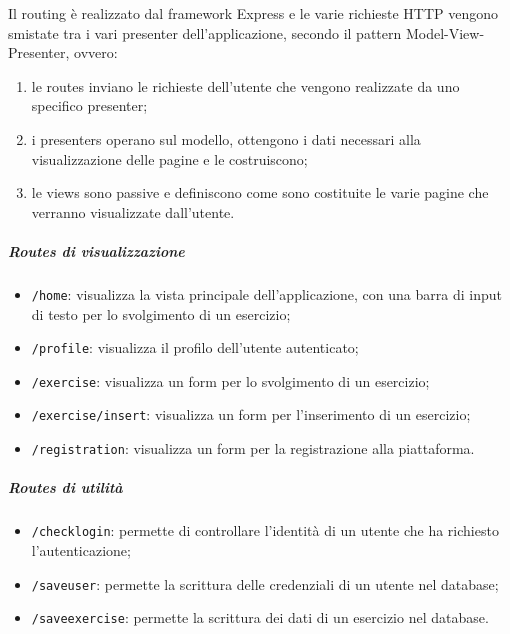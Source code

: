 \noindent Il routing è realizzato dal framework Express e le varie richieste HTTP vengono smistate tra i vari presenter dell'applicazione, secondo il pattern Model-View-Presenter, ovvero:
\begin{enumerate}
	\item le routes inviano le richieste dell'utente che vengono realizzate da uno specifico presenter;
	\item i presenters operano sul modello, ottengono i dati necessari alla visualizzazione delle pagine e le costruiscono;
	\item le views sono passive e definiscono come sono costituite le varie pagine che verranno visualizzate dall'utente.
\end{enumerate}

\subparagraph*{Routes di visualizzazione}
\begin{itemize}
	\item \texttt{/home}: visualizza la vista principale dell'applicazione, con una barra di input di testo per lo svolgimento di un esercizio;
	\item \texttt{/profile}: visualizza il profilo dell'utente autenticato;
	\item \texttt{/exercise}: visualizza un form per lo svolgimento di un esercizio;
	\item \texttt{/exercise/insert}: visualizza un form per l'inserimento di un esercizio;
	\item \texttt{/registration}: visualizza un form per la registrazione alla piattaforma.
\end{itemize}

\subparagraph*{Routes di utilità}
\begin{itemize}
\item \texttt{/checklogin}: permette di controllare l'identità di un utente che ha richiesto l'autenticazione;
\item \texttt{/saveuser}: permette la scrittura delle credenziali di un utente nel database;
\item \texttt{/saveexercise}: permette la scrittura dei dati di un esercizio nel database.
\end{itemize}